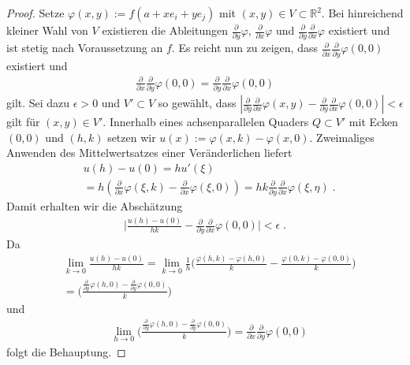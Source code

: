
\begin{proof}
Setze $\varphi(x,y) := f(a + x e_i + y e_j)$ mit $(x,y) \in  V \subset \mathbb{R}^2$. Bei hinreichend kleiner Wahl von $V$ existieren die Ableitungen $ \frac{\partial}{\partial y} \varphi$, $ \frac{\partial}{\partial x} \varphi$ und $ \frac{\partial}{\partial y} \frac{\partial}{\partial x} \varphi$  existiert und ist stetig nach Voraussetzung an $f$. Es reicht nun zu zeigen, dass $ \frac{\partial}{\partial x} \frac{\partial}{\partial y} \varphi (0,0)$ existiert  und 
\begin{align*}
\frac{\partial}{\partial x} \frac{\partial}{\partial y} \varphi(0,0) = \frac{\partial}{\partial y} \frac{\partial}{\partial x} \varphi (0,0)
\end{align*} 
gilt.  Sei dazu $\epsilon > 0$ und $V' \subset V$ so gewählt, dass $| \frac{\partial}{\partial y} \frac{\partial}{\partial x} \varphi(x,y) -  \frac{\partial}{\partial y} \frac{\partial}{\partial x} \varphi(0,0) | < \epsilon$ gilt für $(x,y) \in V'$.
Innerhalb eines achsenparallelen Quaders $Q \subset V'$  mit Ecken $(0,0)$ und $(h,k)$ setzen wir $u(x) := \varphi(x,  k) - \varphi(x, 0)$. Zweimaliges Anwenden des Mittelwertsatzes einer Veränderlichen liefert  
\begin{align*}
& u(h) - u(0) = hu'(\xi) \\
& = h(  \frac{\partial}{\partial x} \varphi(\xi, k) - \frac{\partial}{\partial x} \varphi(\xi, 0) ) = h k \frac{\partial}{\partial y} \frac{\partial}{\partial x} \varphi(\xi, \eta) \; .
\end{align*}
Damit erhalten wir die Abschätzung 
\begin{align*}
\biggl | \frac{ u(h) - u(0)}{hk} -   \frac{\partial}{\partial y} \frac{\partial}{\partial x} \varphi (0,0) \biggr | < \epsilon \; .
\end{align*}
Da 
\begin{align*}
& \lim_{k \to 0 } \frac{ u(h) - u(0)}{hk} =  \lim_{k \to 0 } \frac{1}{h} \biggl(   \frac{\varphi(h,k) - \varphi(h,0)  }{k}  -\frac{\varphi(0,k) - \varphi(0,0)  }{k} \biggr) \\
& =   \biggl(   \frac{  \frac{\partial}{\partial y} \varphi(h,0) -   \frac{\partial}{\partial y}\varphi(0,0)  }{k} \biggr) 
\end{align*}
und 
\begin{align*}
& \lim_{h \to 0 } \biggl(   \frac{  \frac{\partial}{\partial y} \varphi(h,0) -   \frac{\partial}{\partial y}\varphi(0,0)  }{k} \biggr) 
 =     \frac{\partial}{\partial x} \frac{\partial}{\partial y} \varphi(0,0) 
\end{align*}
folgt die Behauptung.
\end{proof}

